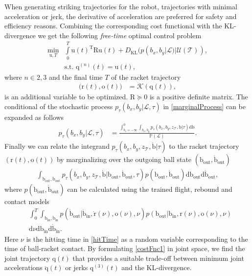 \documentclass[letterpaper, 10 pt, conference]{ieeeconf}
\newcommand{\boldvec}[1]{\boldsymbol{\mathrm{#1}}}
\let\vec\boldvec
\newcommand{\kin}{\mathcal{K}} %
\newcommand{\joint}{\vec{q}} %
\newcommand{\sysInput}{\vec{u}} %
\newcommand{\ball}{\vec{b}} %
\newcommand{\racket}{\vec{r}} %
\newcommand{\orient}{\vec{o}} %
\newcommand{\court}{\mathcal{T}} %
\newcommand{\prob}{\mathbb{P}} %
\newcommand{\landTime}{\tau} %
\newcommand{\landEvent}{\mathcal{L}} %
\newcommand{\hitTime}{\nu} %
\newcommand{\hitDist}{p(\nu)} %
\newcommand{\KL}{D_{\mathrm{KL}}}
\begin{document}
When generating striking trajectories for the robot, trajectories with minimal acceleration or jerk, the derivative of acceleration are preferred for safety and efficiency reasons. Combining the corresponding cost functional with the KL-divergence we get the following \emph{free-time} optimal control problem
%
\begin{align}
\min_{\sysInput,T} & \int\limits_{0}^{T}\sysInput(t)^{\mathrm{T}}\vec{R}\sysInput(t) + \KL(p(b_x,b_y|\landEvent)|\mathcal{U}(\court)), \\
& \textrm{s.t. } \joint^{(n)}(t) = \sysInput(t),
\label{costFnc1}
\end{align}
%
\noindent where $n \in {2,3}$ and the final time $T$ of the racket trajectory 
%
\begin{align}
\big(\racket(t),\orient(t)\big) &= \kin(\joint(t)),
\end{align}
%
\noindent is an additional variable to be optimized. $\vec{R} \succeq 0$ is a positive definite matrix. The conditional of the stochastic process $p_{\landTime}(b_x,b_y|\landEvent,\landTime)$ in \eqref{marginalProcess} can be expanded as follows
%
\begin{align}
p_{\landTime}(b_x,b_y|\landEvent,\landTime) &= \frac{ \int_{\dot{b}_z=-\infty}^{0}\int_{\dot{b}_x,\dot{b}_y}p_{\landTime}(b_x,b_y,z_{\court},\dot{\ball}|\landTime)\mathrm{d}\dot{\ball}}{\prob(\landEvent)}.
\label{marginalDistr2}
\end{align}
%
\noindent Finally we can relate the integrand $p_{\landTime}(b_x,b_y,z_{\court},\dot{\ball}|\landTime)$ to the racket trajectory $(\racket(t),\orient(t))$ by marginalizing over the outgoing ball state $(\ball_{\textrm{out}},\dot{\ball}_{\textrm{out}})$
%
\begin{align}
\int_{\ball_{\textrm{out}},\dot{\ball}_{\textrm{out}}}  p_{\landTime}(b_x,b_y,z_{\court},\dot{\ball}|\ball_{\textrm{out}},\dot{\ball}_{\textrm{out}},\landTime) p(\ball_{\textrm{out}},\dot{\ball}_{\textrm{out}})\textrm{d}\ball_{\textrm{out}}\textrm{d}\dot{\ball}_{\textrm{out}},
\label{fullDistrMarginal1}
\end{align}
%
\noindent where $p(\ball_{\textrm{out}},\dot{\ball}_{\textrm{out}})$ can be calculated using the trained flight, rebound and contact models
%
\begin{align}
&\int_{0}^{T}\!\int_{\ball_{\textrm{in}},\dot{\ball}_{\textrm{in}}}\!p(\dot{\ball}_{\textrm{out}}|\dot{\ball}_{\textrm{in}},\dot{\racket}(\hitTime),\orient(\hitTime),\hitTime) p(\ball_{\textrm{out}}|\ball_{\textrm{in}},\racket(\hitTime),\orient(\hitTime),\hitTime)\\
&\textrm{d}\hitTime\textrm{d}\ball_{\textrm{in}}\textrm{d}\dot{\ball}_{\textrm{in}}. %
\label{fullDistrMarginal2}
\end{align}
%
%
\noindent Here $\hitTime$ is the hitting time in \eqref{hitTime} as a random variable corresponding to the time of ball-racket contact. By formulating \eqref{costFnc1} in joint space, we find the joint trajectory $\joint(t)$ that provides a suitable trade-off between minimum joint accelerations $\ddot{\joint}(t)$ or jerks $\joint^{(3)}(t)$ and the KL-divergence. 
\end{document}
